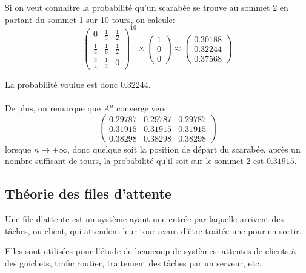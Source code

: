     Si on veut connaitre la probabilité qu'un scarabée se trouve au sommet 2 en
    partant du sommet 1 sur 10 tours, on calcule:
      \[
        \left(\begin{array}{ccc}
          0 & \frac 1 3 & \frac 1 2 \\
          \frac 1 4 & \frac 1 6 & \frac 1 2 \\
          \frac 3 4 & \frac 1 2 & 0
        \end{array}\right)^{10}
        \times
        \left(\begin{array}{c}
          1 \\ 0 \\ 0
        \end{array}\right)
        \approx
        \left(\begin{array}{c}
          0.30188 \\ 0.32244 \\ 0.37568
        \end{array}\right)
      \]

    La probabilité voulue est donc $0.32244$.

    \paragraph{}
    De plus, on remarque que $A^n$ converge vers
      \[
        \left(\begin{array}{ccc}
          0.29787 & 0.29787 & 0.29787 \\
          0.31915 & 0.31915 & 0.31915 \\
          0.38298 & 0.38298 & 0.38298
        \end{array}\right)
      \]
    lorsque $n \to +\infty$, donc quelque soit la position de départ du
    scarabée, après un nombre suffisant de tours, la probabilité qu'il soit sur
    le sommet 2 est $0.31915$.


\subsection{Théorie des files d'attente}
  Une file d'attente est un système ayant une entrée par laquelle arrivent des
  tâches, ou client, qui attendent leur tour avant d'être traitée une pour en
  sortir.

  Elles sont utilisées pour l'étude de beaucoup de systèmes: attentes de
  clients à des guichets, trafic routier, traitement des tâches par un
  serveur, etc.

